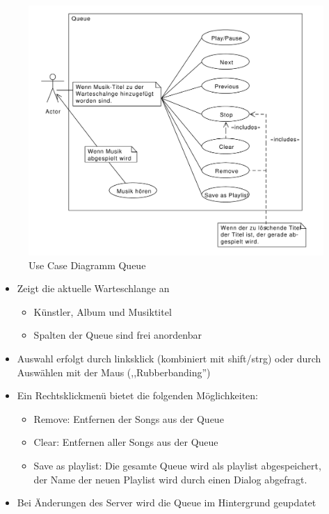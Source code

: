 \begin{figure}[htb!]
	\centering
        \includegraphics[width=\textwidth]{uc_queue.pdf}
	\caption{Use Case Diagramm Queue}
	\label{uc_queue}
\end{figure}

\begin{itemize}
    \item Zeigt die aktuelle Warteschlange an
        \begin{itemize}
            \item Künstler, Album und Musiktitel
            \item Spalten der Queue sind frei anordenbar
        \end{itemize}
    \item Auswahl erfolgt durch linksklick (kombiniert mit shift/strg) oder durch Auswählen mit der Maus (,,Rubberbanding'')
    \item Ein Rechtsklickmenü bietet die folgenden Möglichkeiten:
        \begin{itemize}
            \item Remove: Entfernen der Songs aus der Queue
            \item Clear: Entfernen aller Songs aus der Queue
            \item Save as playlist: Die gesamte Queue wird als playlist abgespeichert, \\
                  der Name der neuen Playlist wird durch einen Dialog abgefragt.
        \end{itemize}
    \item Bei Änderungen des Server wird die Queue im Hintergrund geupdatet
\end{itemize}

